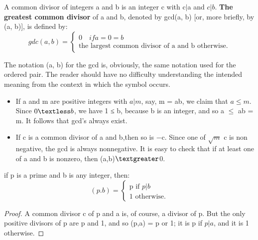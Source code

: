 \documentclass[cn,10pt,math=newtx,citestyle=gb7714-2015,bibstyle=gb7714-2015]{elegantbook}
\begin{document}
\begin{definition}
    A common divisor of integers a and b is an integer c with c$ | $a and $c | b$. \textbf{The greatest common divisor} of a and b, denoted by gcd(a, b) [or, more briefly, by (a, b)], is defined by:
    \begin{equation*}
        gdc(a,b)=\begin{cases}
        0\quad if a=0=b\\
       \text{the largest common divisor of a and b otherwise.}
        \end{cases}
    \end{equation*}
\end{definition}
\begin{note}
    The notation (a, b) for the gcd is, obviously, the same notation used for the ordered pair. The reader should have no difficulty understanding the intended meaning from the context in which the symbol occurs.
\end{note}
\begin{note}
    
    \begin{itemize}
        \item If a and m are positive integers with $a | m$, say, m = ab, we claim that $a \leq m$. Since $0\textless b$, we have 1 ≤ b, because b is an integer, and so a $\leq$ ab = m. It follows that gcd’s always exist.
        \item If c is a common divisor of a and b,then so is −c. Since one of $\sqrt{m}$ c is non negative, the gcd is always nonnegative. It is easy to check that if at least one of a and b is nonzero, then (a,b)$\textgreater$0.
    \end{itemize}
\end{note}

\begin{proposition}
    if p is a prime and b is any integer, then:
    \begin{equation*}
        (p.b)=\begin{cases}
            \text{p if $p|b$}\\
            \text{1 otherwise.}
            \end{cases}
    \end{equation*}
    
\end{proposition}
\begin{proof}
A common divisor c of p and a is, of course, a divisor of p. But the only positive divisors of p are p and 1, and so (p,a) = p or 1; it is p if $p| a$, and it is 1 otherwise.
\end{proof}
\end{document}
